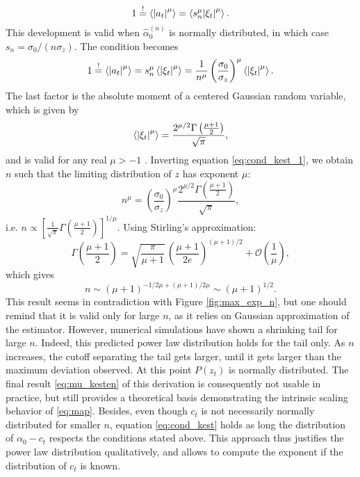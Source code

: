 \documentclass[FinalReport.tex]{subfiles}
\begin{document}
\begin{equation}
	1\stackrel{!}{=}\expval{\abs{a_t}^\mu}=\expval{s_n^\mu \abs{\xi_t}^\mu}.
\end{equation}
This development is valid when $\hat{\alpha}_0^{(n)}$ is normally distributed, in which case $s_n=\sigma_0/(n\sigma_z)$. The condition becomes
\begin{equation}\label{eq:cond_kest_1}
	1\stackrel{!}{=}\expval{\abs{a_t}^\mu}=s_n^\mu\expval{ \abs{\xi_t}^\mu}=\frac{1}{n^\mu} \left(\frac{\sigma_0}{\sigma_z}\right)^\mu\expval{\abs{\xi_t}^\mu}.
\end{equation}
The last factor is the absolute moment of a centered Gaussian random variable, which is given by
\begin{equation}
	\expval{\abs{\xi_t}^\mu}= \frac{2^{\mu/2}\Gamma\left(\frac{\mu+1} 2 \right)}{\sqrt\pi},
\end{equation}
and is valid for any real $\mu>-1$ \cite{moments}. Inverting equation \eqref{eq:cond_kest_1}, we obtain $n$ such that the limiting distribution of $z$ has exponent $\mu$:
\begin{equation}
	n^\mu=\left(\frac{\sigma_0}{\sigma_z}\right)^\mu\frac{2^{\mu/2}\Gamma\left(\frac{\mu+1} 2 \right)}{\sqrt\pi},
\end{equation}
i.e. $n\propto \left[\frac{1}{\sqrt{\pi}} \Gamma\left(\frac{\mu+1} 2 \right)\right]^{1/\mu} $. Using Stirling's approximation:
\begin{equation}
	\Gamma\left(\frac{\mu+1}{2}\right)=\sqrt{\frac{\pi}{\mu+1}}\,{\left(\frac{\mu+1}{2e}\right)}^{(\mu+1)/2} +\mathcal{O}\left(\frac{1}{\mu}\right), 
\end{equation}
which gives 
\begin{equation}\label{eq:mu_kesten}
	n\sim (\mu+1)^{-1/2\mu + (\mu+1)/2\mu}\sim (\mu+1)^{1/2}.
\end{equation}
This result seems in contradiction with Figure \ref{fig:max_exp_n}, but one should remind that it is valid only for large $n$, as it relies on Gaussian approximation of the estimator. However, numerical simulations have shown a shrinking tail for large $n$. Indeed, this predicted power law distribution holds for the tail only. As $n$ increases, the cutoff separating the tail gets larger, until it gets larger than the maximum deviation observed. At this point $P(z_t)$ is normally distributed. The final result \eqref{eq:mu_kesten} of this derivation is consequently not usable in practice, but still provides a theoretical basis demonstrating the intrinsic scaling behavior of \eqref{eq:map}. Besides, even though $c_t$ is not necessarily normally distributed for smaller $n$, equation \eqref{eq:cond_kest} holds as long the distribution of $\alpha_0-c_t$ respects the conditions stated above. This approach thus justifies the power law distribution qualitatively, and allows to compute the exponent if the distribution of $c_t$ is known.
  
\end{document}
